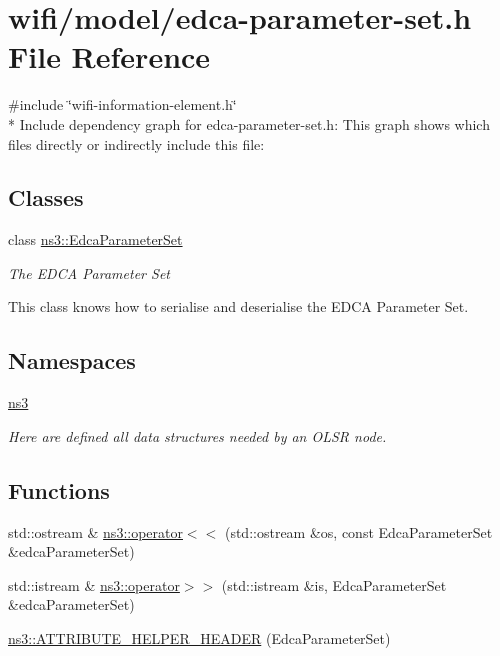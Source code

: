 \hypertarget{edca-parameter-set_8h}{}\section{wifi/model/edca-\/parameter-\/set.h File Reference}
\label{edca-parameter-set_8h}
{\ttfamily \#include \char`\"{}wifi-\/information-\/element.\+h\char`\"{}}\\*
Include dependency graph for edca-\/parameter-\/set.h\+:
This graph shows which files directly or indirectly include this file\+:
\subsection*{Classes}
\begin{DoxyCompactItemize}
\item 
class \hyperlink{classns3_1_1EdcaParameterSet}{ns3\+::\+Edca\+Parameter\+Set}
\begin{DoxyCompactList}\small\item\em The E\+D\+CA Parameter Set

This class knows how to serialise and deserialise the E\+D\+CA Parameter Set. \end{DoxyCompactList}\end{DoxyCompactItemize}
\subsection*{Namespaces}
\begin{DoxyCompactItemize}
\item 
 \hyperlink{namespacens3}{ns3}
\begin{DoxyCompactList}\small\item\em Here are defined all data structures needed by an O\+L\+SR node. \end{DoxyCompactList}\end{DoxyCompactItemize}
\subsection*{Functions}
\begin{DoxyCompactItemize}
\item 
std\+::ostream \& \hyperlink{namespacens3_aac75e3a89f5c3fd5176c9f6f6207b5f7}{ns3\+::operator$<$$<$} (std\+::ostream \&os, const Edca\+Parameter\+Set \&edca\+Parameter\+Set)
\item 
std\+::istream \& \hyperlink{namespacens3_aa72e7688c29e91f9322b7b79918521ab}{ns3\+::operator$>$$>$} (std\+::istream \&is, Edca\+Parameter\+Set \&edca\+Parameter\+Set)
\item 
\hyperlink{namespacens3_a41b958cf58b65a62d2788d5d5b03a402}{ns3\+::\+A\+T\+T\+R\+I\+B\+U\+T\+E\+\_\+\+H\+E\+L\+P\+E\+R\+\_\+\+H\+E\+A\+D\+ER} (Edca\+Parameter\+Set)
\end{DoxyCompactItemize}
